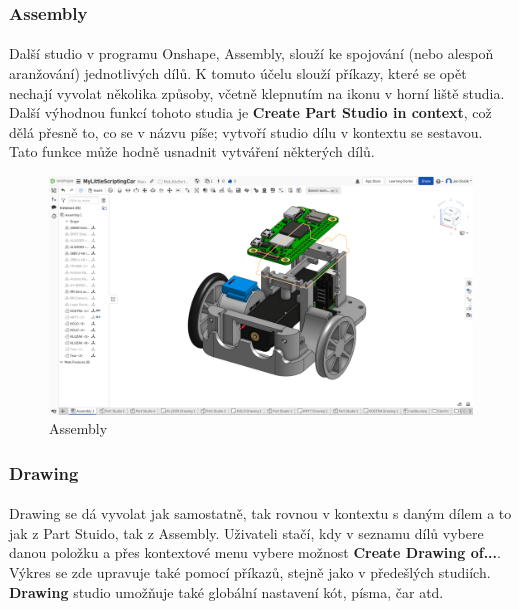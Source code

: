 \documentclass[12pt]{article}
\begin{document}
\begin{spacing}{1.5}
	\subsubsection*{Assembly}
	\paragraph{} Další studio v programu Onshape, Assembly, slouží ke spojování (nebo alespoň aranžování) jednotlivých dílů. K tomuto účelu slouží příkazy, které se opět nechají vyvolat několika způsoby, včetně klepnutím na ikonu v horní liště studia. Další výhodnou funkcí tohoto studia je \textbf{Create Part Studio in context}, což dělá přesně to, co se v názvu píše; vytvoří studio dílu v kontextu se sestavou. Tato funkce může hodně usnadnit vytváření některých dílů.
	
	\begin{figure}[H]
		\centering
		\includegraphics[width=\linewidth]{assembly_studio}
		\caption{Assembly}
		\label{fig:assembly_studio}
	\end{figure}
	
	\subsubsection*{Drawing}
	\paragraph{} Drawing se dá vyvolat jak samostatně, tak rovnou v kontextu s daným dílem a to jak z Part Stuido, tak z Assembly. Uživateli stačí, kdy v seznamu dílů vybere danou položku a přes kontextové menu vybere možnost \textbf{Create Drawing of...}. Výkres se zde upravuje také pomocí příkazů, stejně jako v předešlých studiích. \textbf{Drawing} studio umožňuje také globální nastavení kót, písma, čar atd.
	

\end{spacing}
\end{document}
